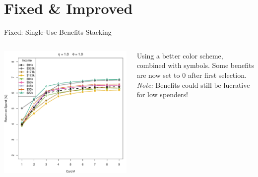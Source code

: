 \section{Fixed \& Improved}

%

\begin{frame}{Fixed: Single-Use Benefits Stacking}
    \begin{columns}[c]
        \begin{column}{0.7\textwidth}
            \includegraphics[width=0.9\textheight]{../Figures/ROSvsKvsIncome_1_1.pdf}
        \end{column}
        \begin{column}{0.3\textwidth}
            \centering
            Using a better color scheme, combined with symbols.
            \vskip16pt
            Some benefits are now set to 0 after first selection.
            \vskip16pt
            \emph{Note:} Benefits could still be lucrative for low spenders!
        \end{column}
    \end{columns}
\end{frame} 

